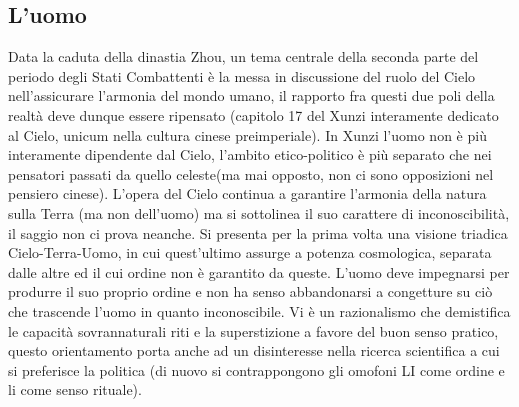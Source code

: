 \documentclass[10pt,a4paper]{report}
\begin{document}
\subsection{L'uomo} 
Data la caduta della dinastia Zhou, un tema centrale della seconda parte del periodo degli Stati Combattenti è la messa in discussione del ruolo del Cielo nell'assicurare l'armonia del mondo umano, il rapporto fra questi due poli della realtà deve dunque essere ripensato (capitolo 17 del Xunzi interamente dedicato al Cielo, unicum nella cultura cinese preimperiale). In Xunzi l'uomo non è più interamente dipendente dal Cielo, l'ambito etico-politico è più separato che nei pensatori passati da quello celeste(ma mai opposto, non ci sono opposizioni nel pensiero cinese). L'opera del Cielo continua a garantire l'armonia della natura sulla Terra (ma non dell'uomo) ma si sottolinea il suo carattere di inconoscibilità, il saggio non ci prova neanche. Si presenta per la prima volta una visione triadica Cielo-Terra-Uomo, in cui quest'ultimo assurge a potenza cosmologica, separata dalle altre ed il cui ordine non è garantito da queste. L'uomo deve impegnarsi per produrre il suo proprio ordine e non ha senso abbandonarsi a congetture su ciò che trascende l'uomo in quanto inconoscibile. Vi è un razionalismo che demistifica le capacità sovrannaturali riti e la superstizione a favore del buon senso pratico, questo orientamento porta anche ad un disinteresse nella ricerca scientifica a cui si preferisce la politica (di nuovo si contrappongono gli omofoni LI come ordine e li come senso rituale).\\
\end{document}
